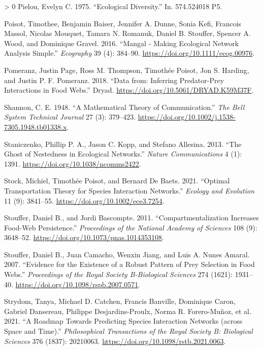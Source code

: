 \documentclass[10pt,oneside]{article}
\newlength{\cslhangindent}
\newenvironment{CSLReferences}[3] %
 {%
  \setlength{\parindent}{0pt}
  \ifodd #1 \everypar{\setlength{\hangindent}{\cslhangindent}}\ignorespaces\fi
  \ifnum #2 > 0
  \setlength{\parskip}{#2\baselineskip}
  \fi
 }%
 {}
\begin{document}
\begin{CSLReferences}{1}{0}
\leavevmode\hypertarget{ref-Pielou1975EcoDiv}{}%
Pielou, Evelyn C. 1975. {``Ecological Diversity.''} In. 574.524018 P5.

\leavevmode\hypertarget{ref-Poisot2016ManMakb}{}%
Poisot, Timothee, Benjamin Baiser, Jennifer A. Dunne, Sonia Kefi,
Francois Massol, Nicolas Mouquet, Tamara N. Romanuk, Daniel B. Stouffer,
Spencer A. Wood, and Dominique Gravel. 2016. {``Mangal - Making
Ecological Network Analysis Simple.''} \emph{Ecography} 39 (4): 384--90.
\url{https://doi.org/10.1111/ecog.00976}.

\leavevmode\hypertarget{ref-Pomeranz2018DatInf}{}%
Pomeranz, Justin Page, Ross M. Thompson, Timothée Poisot, Jon S.
Harding, and Justin P. F. Pomeranz. 2018. {``Data from: Inferring
Predator-Prey Interactions in Food Webs.''} Dryad.
\url{https://doi.org/10.5061/DRYAD.K59M37F}.

\leavevmode\hypertarget{ref-Shannon1948MatThe}{}%
Shannon, C. E. 1948. {``A Mathematical Theory of Communication.''}
\emph{The Bell System Technical Journal} 27 (3): 379--423.
\url{https://doi.org/10.1002/j.1538-7305.1948.tb01338.x}.

\leavevmode\hypertarget{ref-Staniczenko2013GhoNes}{}%
Staniczenko, Phillip P. A., Jason C. Kopp, and Stefano Allesina. 2013.
{``The Ghost of Nestedness in Ecological Networks.''} \emph{Nature
Communications} 4 (1): 1391. \url{https://doi.org/10.1038/ncomms2422}.

\leavevmode\hypertarget{ref-Stock2021OptTra}{}%
Stock, Michiel, Timothée Poisot, and Bernard De Baets. 2021. {``Optimal
Transportation Theory for Species Interaction Networks.''} \emph{Ecology
and Evolution} 11 (9): 3841--55.
\url{https://doi.org/10.1002/ece3.7254}.

\leavevmode\hypertarget{ref-Stouffer2011ComInc}{}%
Stouffer, Daniel B., and Jordi Bascompte. 2011. {``Compartmentalization
Increases Food-Web Persistence.''} \emph{Proceedings of the National
Academy of Sciences} 108 (9): 3648--52.
\url{https://doi.org/10.1073/pnas.1014353108}.

\leavevmode\hypertarget{ref-Stouffer2007EviExi}{}%
Stouffer, Daniel B., Juan Camacho, Wenxin Jiang, and Luis A. Nunes
Amaral. 2007. {``Evidence for the Existence of a Robust Pattern of Prey
Selection in Food Webs.''} \emph{Proceedings of the Royal Society
B-Biological Sciences} 274 (1621): 1931--40.
\url{https://doi.org/10.1098/rspb.2007.0571}.

\leavevmode\hypertarget{ref-Strydom2021RoaPre}{}%
Strydom, Tanya, Michael D. Catchen, Francis Banville, Dominique Caron,
Gabriel Dansereau, Philippe Desjardins-Proulx, Norma R. Forero-Muñoz, et
al. 2021. {``A Roadmap Towards Predicting Species Interaction Networks
(across Space and Time).''} \emph{Philosophical Transactions of the
Royal Society B: Biological Sciences} 376 (1837): 20210063.
\url{https://doi.org/10.1098/rstb.2021.0063}.


\end{CSLReferences}
\end{document}
